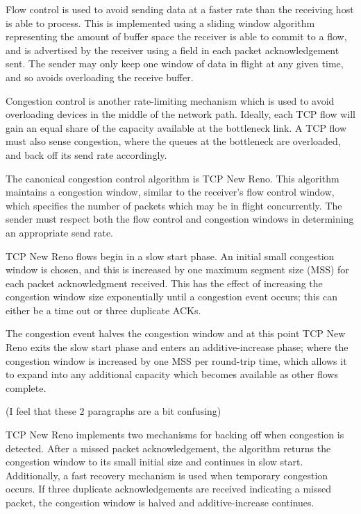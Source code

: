 Flow control is used to avoid sending data at a faster rate than the receiving
host is able to process. This is implemented using a sliding window algorithm
representing the amount of buffer space the receiver is able to commit to a
flow, and is advertised by the receiver using a field in each packet
acknowledgement sent. The sender may only keep one window of data in flight at
any given time, and so avoids overloading the receive buffer.

Congestion control is another rate-limiting mechanism which is used to avoid
overloading devices in the middle of the network path. Ideally, each TCP flow
will gain an equal share of the capacity available at the bottleneck link. A TCP
flow must also sense congestion, where the queues at the bottleneck are
overloaded, and back off its send rate accordingly.

The canonical congestion control algorithm is TCP New Reno. This algorithm
maintains a congestion window, similar to the receiver's flow control window,
which specifies the number of packets which may be in flight concurrently. The
sender must respect both the flow control and congestion windows in determining
an appropriate send rate.

TCP New Reno flows begin in a slow start phase. An initial small congestion
window is chosen, and this is increased by one maximum segment size (MSS) for
each packet acknowledgment received. This has the effect of increasing the
congestion window size exponentially until a congestion event occurs; this can
either be a time out or three duplicate ACKs. 

The congestion event halves the congestion window and at this point TCP New Reno
exits the slow start phase and enters an additive-increase phase; where the
congestion window is increased by one MSS per round-trip time, which allows it
to expand into any additional capacity which becomes available as other flows
complete.

(I feel that these 2 paragraphs are a bit confusing)

TCP New Reno implements two mechanisms for backing off when congestion is
detected. After a missed packet acknowledgement, the algorithm returns the
congestion window to its small initial size and continues in slow start.
Additionally, a fast recovery mechanism is used when temporary congestion
occurs. If three duplicate acknowledgements are received indicating a missed
packet, the congestion window is halved and additive-increase continues.

